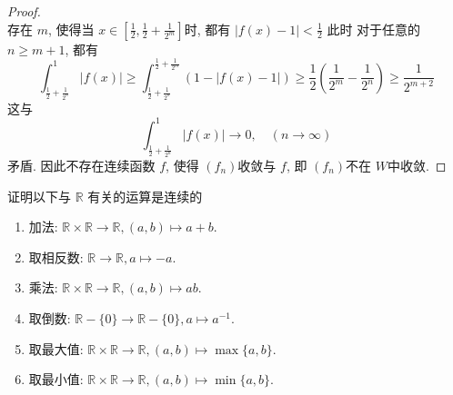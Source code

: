 \documentclass[../main.tex]{subfiles}
\begin{document}
\begin{proof}
\[    \] 存在 \(  m   \), 使得当 \(  x \in \left[ \frac{1}{2},\frac{1 }{2 }+ \frac{1 }{2^{m} }   \right]   \)时, 都有 \(  \left| f\left( x \right)-1  \right|< \frac{1 }{2 }    \)   此时 对于任意的 \(  n\ge m+ 1  \), 都有 \[
    \int_{\frac{1}{2}+ \frac{1 }{2^{n} } }^{1}\left| f\left( x \right)  \right|\ge  \int_{\frac{1}{2}+ \frac{1 }{2^{n} } }^{\frac{1}{2}+ \frac{1 }{2^{m} }}\left( 1-\left| f\left( x \right)-1  \right|  \right) \ge \frac{1}{2}\left( \frac{1 }{2^{m} }-\frac{1 }{2^{n} }   \right) \ge \frac{1 }{2^{m+ 2} } 
    \]这与 \[
    \int_{\frac{1}{2}+ \frac{1 }{2^{n} } }^{1}\left| f\left( x \right)  \right|\to 0,\quad (n\to \infty) 
    \]矛盾. 因此不存在连续函数 \(  f  \), 使得 \(  \left( f_{n} \right)   \)收敛与 \(  f  \), 即 \(  \left( f_{n} \right)   \)不在 \(  W  \)中收敛.     
\end{proof}

\begin{exercise}{}{}
  证明以下与 \(  \mathbb{R}   \)  有关的运算是连续的
  \begin{enumerate}
    \item 加法: $\mathbb{R} \times \mathbb{R} \to \mathbb{R}, (a, b) \mapsto a + b$.
    \item 取相反数: $\mathbb{R} \to \mathbb{R}, a \mapsto -a$.
    \item 乘法: $\mathbb{R} \times \mathbb{R} \to \mathbb{R}, (a, b) \mapsto ab$.
    \item 取倒数: $\mathbb{R} - \{0\} \to \mathbb{R} - \{0\}, a \mapsto a^{-1}$.
    \item 取最大值: $\mathbb{R} \times \mathbb{R} \to \mathbb{R}, (a, b) \mapsto \max\{a, b\}$.
    \item 取最小值: $\mathbb{R} \times \mathbb{R} \to \mathbb{R}, (a, b) \mapsto \min\{a, b\}$.
\end{enumerate}
\end{exercise}
\end{document}
